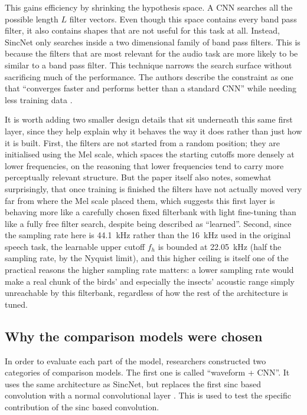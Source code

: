 \documentclass[11pt]{article}
\begin{document}
This gains efficiency by shrinking the hypothesis space. A CNN searches all the possible length $L$ filter vectors. Even though this space contains every band pass filter, it also contains shapes that are not useful for this task at all. Instead, SincNet only searches inside a two dimensional family of band pass filters. This is because the filters that are most relevant for the audio task are more likely to be similar to a band pass filter. This technique narrows the search surface without sacrificing much of the performance. The authors describe the constraint as one that ``converges faster and performs better than a standard CNN'' while needing less training data \citep{bravosanchez2021}.

It is worth adding two smaller design details that sit underneath this same first layer, since they help explain why it behaves the way it does rather than just how it is built. First, the filters are not started from a random position; they are initialised using the Mel scale, which spaces the starting cutoffs more densely at lower frequencies, on the reasoning that lower frequencies tend to carry more perceptually relevant structure. But the paper itself also notes, somewhat surprisingly, that once training is finished the filters have not actually moved very far from where the Mel scale placed them, which suggests this first layer is behaving more like a carefully chosen fixed filterbank with light fine-tuning than like a fully free filter search, despite being described as ``learned''. Second, since the sampling rate here is 44.1~kHz rather than the 16~kHz used in the original speech task, the learnable upper cutoff $f_h$ is bounded at 22.05~kHz (half the sampling rate, by the Nyquist limit), and this higher ceiling is itself one of the practical reasons the higher sampling rate matters: a lower sampling rate would make a real chunk of the birds' and especially the insects' acoustic range simply unreachable by this filterbank, regardless of how the rest of the architecture is tuned.

\subsection{Why the comparison models were chosen}

In order to evaluate each part of the model, researchers constructed two categories of comparison models. The first one is called ``waveform + CNN''. It uses the same architecture as SincNet, but replaces the first sinc based convolution with a normal convolutional layer \citep{bravosanchez2021}. This is used to test the specific contribution of the sinc based convolution.
\end{document}
